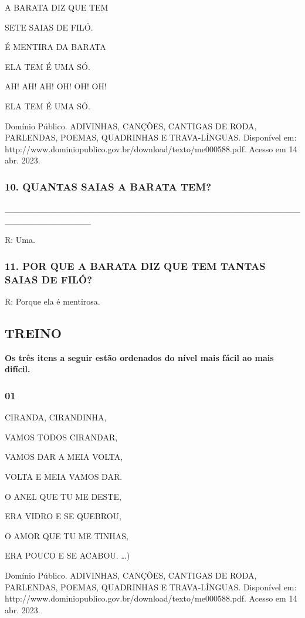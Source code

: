 A BARATA DIZ QUE TEM

SETE SAIAS DE FILÓ. 

É MENTIRA DA BARATA

ELA TEM É UMA SÓ.

AH! AH! AH! OH! OH! OH! 

ELA TEM É UMA SÓ. 

Domínio Público. ADIVINHAS, CANÇÕES, CANTIGAS DE RODA, PARLENDAS, POEMAS, QUADRINHAS E TRAVA-LÍNGUAS. Disponível em: http://www.dominiopublico.gov.br/download/texto/me000588.pdf. Acesso em 14 abr. 2023.

\subsubsection{10. QUANTAS SAIAS A BARATA TEM?}

\_\_\_\_\_\_\_\_\_\_\_\_\_\_\_\_\_\_\_\_\_\_\_\_\_\_\_\_\_\_\_\_\_\_\_\_\_\_\_\_\_\_\_\_\_\_\_\_\_\_\_\_\_\_\_\_\_\_\_\_\_\_

R: Uma.

\subsubsection{11. POR QUE A BARATA DIZ QUE TEM TANTAS SAIAS DE FILÓ?}

R: Porque ela é mentirosa.

\subsection{TREINO}\label{treino-5}

\textbf{Os três itens a seguir estão ordenados do nível mais fácil ao mais
difícil. }

\subsubsection{01}\label{section-20}

CIRANDA, CIRANDINHA,

VAMOS TODOS CIRANDAR,

VAMOS DAR A MEIA VOLTA, 

VOLTA E MEIA VAMOS DAR. 

O ANEL QUE TU ME DESTE, 

ERA VIDRO E SE QUEBROU, 

O AMOR QUE TU ME TINHAS, 

ERA POUCO E SE ACABOU.
\ldots{})

Domínio Público. ADIVINHAS, CANÇÕES, CANTIGAS DE RODA, PARLENDAS, POEMAS, QUADRINHAS E TRAVA-LÍNGUAS. Disponível em: http://www.dominiopublico.gov.br/download/texto/me000588.pdf. Acesso em 14 abr. 2023.

